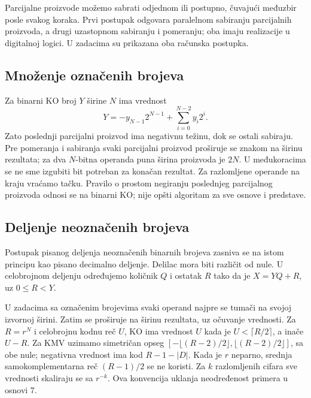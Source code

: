 \documentclass[a4paper,11pt]{article}
\numberwithin{equation}{section}
\newcommand{\napomena}[1]{\begin{tcolorbox}[colback=gray!10,colframe=black,boxrule=0.5pt,breakable]#1\end{tcolorbox}}
\begin{document}
Parcijalne proizvode možemo sabrati odjednom ili postupno, čuvajući međuzbir posle svakog koraka. Prvi postupak odgovara paralelnom sabiranju parcijalnih proizvoda, a drugi uzastopnom sabiranju i pomeranju; oba imaju realizacije u digitalnoj logici. U zadacima su prikazana oba računska postupka.



\FloatBarrier
\subsection{Množenje označenih brojeva}\label{sec:1.6}


Za binarni KO broj $Y$ širine $N$ ima vrednost
\[Y=-y_{N-1}2^{N-1}+\sum_{i=0}^{N-2}y_i2^i.\]
Zato poslednji parcijalni proizvod ima negativnu težinu, dok se ostali sabiraju. Pre pomeranja i sabiranja svaki parcijalni proizvod proširuje se znakom na širinu rezultata; za dva $N$-bitna operanda puna širina proizvoda je $2N$. U međukoracima se ne sme izgubiti bit potreban za konačan rezultat. Za razlomljene operande na kraju vraćamo tačku. Pravilo o prostom negiranju poslednjeg parcijalnog proizvoda odnosi se na binarni KO; nije opšti algoritam za sve osnove i predstave.

\FloatBarrier
\subsection{Deljenje neoznačenih brojeva}\label{sec:1.7}


Postupak pisanog deljenja neoznačenih binarnih brojeva zasniva se na istom principu kao pisano decimalno deljenje. Delilac mora biti različit od nule. U celobrojnom deljenju određujemo količnik $Q$ i ostatak $R$ tako da je $X=YQ+R$, uz $0\le R<Y$.


\napomena{U zadacima sa označenim brojevima svaki operand najpre se tumači na svojoj izvornoj širini. Zatim se proširuje na širinu rezultata, uz očuvanje vrednosti. Za $R=r^N$ i celobrojnu kodnu reč $U$, KO ima vrednost $U$ kada je $U<\lceil R/2\rceil$, a inače $U-R$. Za KMV uzimamo simetričan opseg $[-\lfloor(R-2)/2\rfloor,\lfloor(R-2)/2\rfloor]$, sa obe nule; negativna vrednost ima kod $R-1-|D|$. Kada je $r$ neparno, srednja samokomplementarna reč $(R-1)/2$ se ne koristi. Za $k$ razlomljenih cifara sve vrednosti skaliraju se sa $r^{-k}$. Ova konvencija uklanja neodređenost primera u osnovi 7.}

\FloatBarrier
\end{document}
